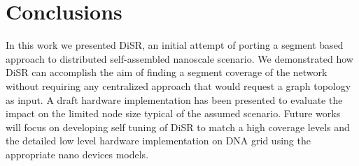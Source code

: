 \documentclass[final,journal,letterpaper]{IEEEtran}
\begin{document}







\section{Conclusions}
In this work we presented DiSR, an initial attempt of porting a segment based
approach to distributed self-assembled nanoscale scenario. We
demonstrated how DiSR can accomplish the aim of finding a segment
coverage of the network without requiring any centralized approach
that would request a graph topology as input. A draft hardware
implementation has been presented to evaluate the impact on the limited
node size typical of the assumed scenario. Future works will focus on
developing self tuning of DiSR to match a high coverage levels and the
detailed low level hardware implementation on
DNA grid using the appropriate nano devices models.


\balance

 


\end{document}
